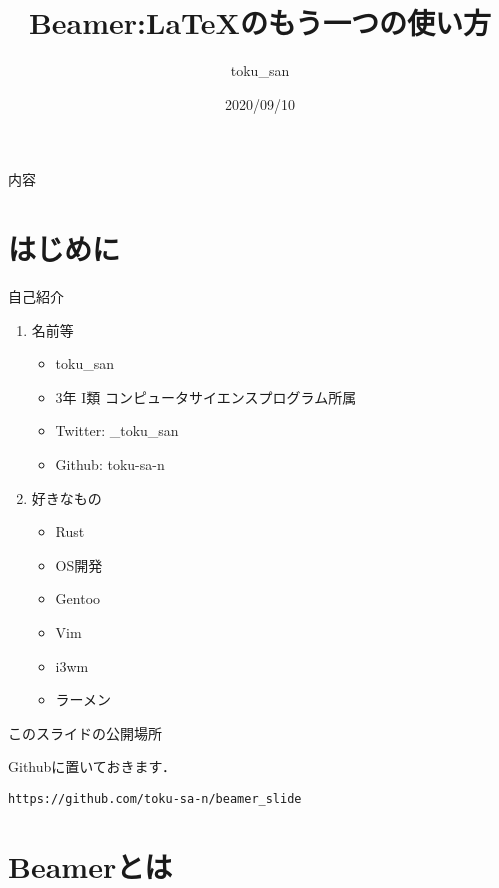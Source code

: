 \documentclass[dvipdfmx,uplatex,a4j,12pt]{beamer}
\title{Beamer:\LaTeX のもう一つの使い方}
\author{toku\_san}
\date{2020/09/10}
\begin{document}
\begin{frame}
    \titlepage
\end{frame}

\begin{frame}{内容}
    \tableofcontents
\end{frame}

\section{はじめに}

\begin{frame}{自己紹介}

    \begin{enumerate}
        \item 名前等
            \begin{itemize}
                \item toku\_san
                \item 3年 I類 コンピュータサイエンスプログラム所属
                \item Twitter: \_toku\_san
                \item Github: toku-sa-n
            \end{itemize}
        \item 好きなもの
            \begin{itemize}
                \item Rust
                \item OS開発
                \item Gentoo
                \item Vim
                \item i3wm
                \item ラーメン
            \end{itemize}
    \end{enumerate}
\end{frame}

\begin{frame}[fragile]{このスライドの公開場所}

    Githubに置いておきます．

    \begin{verbatim}
https://github.com/toku-sa-n/beamer_slide
    \end{verbatim}
\end{frame}

\section{Beamerとは}
\end{document}
